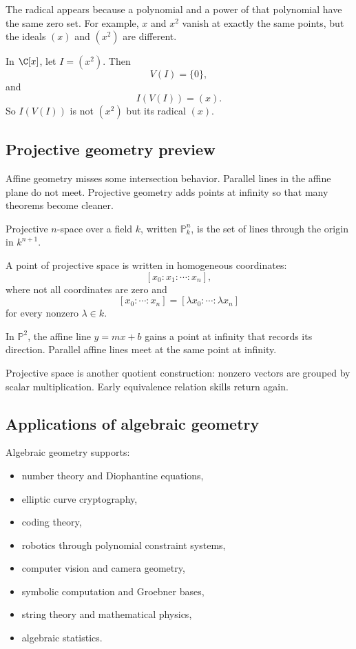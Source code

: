 The radical appears because a polynomial and a power of that polynomial have the
same zero set. For example, $x$ and $x^2$ vanish at exactly the same points, but
the ideals $(x)$ and $(x^2)$ are different.

\begin{example}
In $\C[x]$, let $I=(x^2)$. Then
\[
V(I)=\{0\},
\]
and
\[
I(V(I))=(x).
\]
So $I(V(I))$ is not $(x^2)$ but its radical $(x)$.
\end{example}

\subsection{Projective geometry preview}

Affine geometry misses some intersection behavior. Parallel lines in the affine
plane do not meet. Projective geometry adds points at infinity so that many
theorems become cleaner.

\begin{definition}
Projective $n$-space over a field $k$, written $\mathbb{P}^n_k$, is the set of
lines through the origin in $k^{n+1}$.
\end{definition}

A point of projective space is written in homogeneous coordinates:
\[
[x_0:x_1:\cdots:x_n],
\]
where not all coordinates are zero and
\[
[x_0:\cdots:x_n]=[\lambda x_0:\cdots:\lambda x_n]
\]
for every nonzero $\lambda\in k$.

\begin{example}
In $\mathbb{P}^2$, the affine line $y=mx+b$ gains a point at infinity that
records its direction. Parallel affine lines meet at the same point at infinity.
\end{example}

Projective space is another quotient construction: nonzero vectors are grouped
by scalar multiplication. Early equivalence relation skills return again.

\subsection{Applications of algebraic geometry}

Algebraic geometry supports:

\begin{itemize}
\item number theory and Diophantine equations,
\item elliptic curve cryptography,
\item coding theory,
\item robotics through polynomial constraint systems,
\item computer vision and camera geometry,
\item symbolic computation and Groebner bases,
\item string theory and mathematical physics,
\item algebraic statistics.
\end{itemize}

